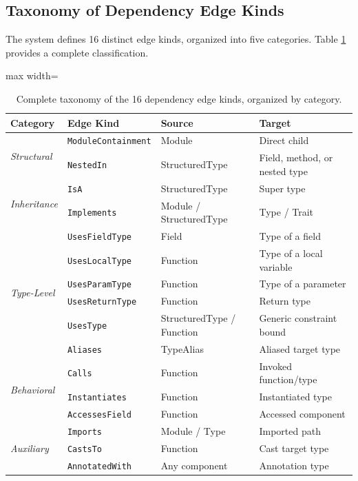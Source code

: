 \subsection{Taxonomy of Dependency Edge Kinds}

The system defines 16 distinct edge kinds, organized into five
categories. Table \ref{tab:edge_taxonomy} provides a complete classification.

\begin{table}[htpb]
  \centering
  \small
  \begin{adjustbox}{max width=\textwidth}
    \begin{tabular}{|l|l|l|l|}
      \hline
      \textbf{Category} & \textbf{Edge Kind} & \textbf{Source} &
      \textbf{Target} \\ \hline
      \multirow{2}{*}{\textit{Structural}} & \texttt{ModuleContainment}
      & Module & Direct child \\ \cline{2-4}
      & \texttt{NestedIn} & StructuredType & Field, method, or nested
      type \\ \hline

      \multirow{2}{*}{\textit{Inheritance}} & \texttt{IsA} &
      StructuredType & Super type \\ \cline{2-4}
      & \texttt{Implements} & Module / StructuredType & Type / Trait \\ \hline

      \multirow{6}{*}{\textit{Type-Level}} & \texttt{UsesFieldType} &
      Field & Type of a field \\ \cline{2-4}
      & \texttt{UsesLocalType} & Function & Type of a local variable
      \\ \cline{2-4}
      & \texttt{UsesParamType} & Function & Type of a parameter \\ \cline{2-4}
      & \texttt{UsesReturnType} & Function & Return type \\ \cline{2-4}
      & \texttt{UsesType} & StructuredType / Function & Generic
      constraint bound \\ \cline{2-4}
      & \texttt{Aliases} & TypeAlias & Aliased target type \\ \hline

      \multirow{3}{*}{\textit{Behavioral}} & \texttt{Calls} & Function
      & Invoked function/type \\ \cline{2-4}
      & \texttt{Instantiates} & Function & Instantiated type \\ \cline{2-4}
      & \texttt{AccessesField} & Function & Accessed component \\ \hline

      \multirow{3}{*}{\textit{Auxiliary}} & \texttt{Imports} & Module /
      Type & Imported path \\ \cline{2-4}
      & \texttt{CastsTo} & Function & Cast target type \\ \cline{2-4}
      & \texttt{AnnotatedWith} & Any component & Annotation type \\ \hline
    \end{tabular}
  \end{adjustbox}
  \caption{Complete taxonomy of the 16 dependency edge kinds,
  organized by category.}
  \label{tab:edge_taxonomy}
\end{table}

